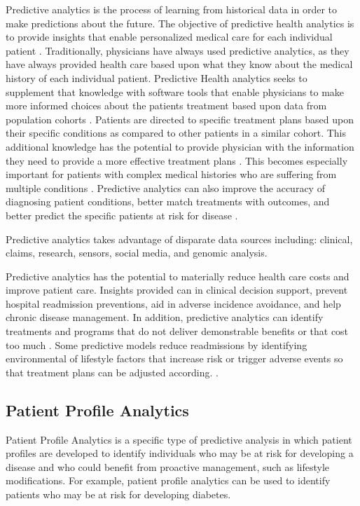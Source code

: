 \documentclass[sigconf]{acmart}
\begin{document}
Predictive analytics is the process of learning from historical data in order to make predictions about the future. The objective of predictive health analytics is to provide insights that enable personalized medical care for each individual patient \cite{www-google-rock}. Traditionally, physicians have always used predictive analytics, as they have always provided health care based upon what they know about the medical history of each individual patient. Predictive Health analytics seeks to supplement that knowledge with software tools that enable physicians to make more informed choices about the patients treatment based upon data from population cohorts \cite{www-google-pred}.  Patients are directed to specific treatment plans based upon their specific conditions as compared to other patients in a similar cohort.  This additional knowledge has the potential to provide physician with the information they need to provide a more effective treatment plans \cite{www-google-pred}. This becomes especially important for patients with complex medical histories who are suffering from multiple conditions \cite{www-google-datapine}.  Predictive analytics can also improve the accuracy of diagnosing patient conditions, better match treatments with outcomes, and better predict the specific patients at risk for disease \cite{www-google-datapine}. 

Predictive analytics takes advantage of disparate data sources including: clinical, claims, research, sensors, social media, and genomic analysis.  

Predictive analytics has the potential to materially reduce health care costs and improve patient care.   Insights provided can in clinical decision support, prevent hospital readmission preventions, aid in adverse incidence avoidance, and help chronic disease management. In addition, predictive analytics can identify treatments and programs that do not deliver demonstrable benefits or that cost too much \cite{springer}. Some predictive models reduce readmissions by identifying environmental of lifestyle factors that increase risk or trigger adverse events so that treatment plans can be adjusted according. \cite{springer}. 

\subsection{Patient Profile Analytics}

Patient Profile Analytics is a specific type of predictive analysis in which patient profiles are developed to identify individuals who may be at risk for developing a disease and who could benefit from proactive management, such as lifestyle modifications.  For example, patient profile analytics can be used to identify patients who may be at risk for developing diabetes. 
\end{document}
